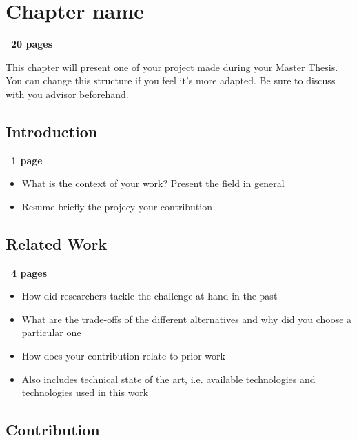 \chapter{Chapter name}

\textbf{~20 pages}

This chapter will present one of your project made during your Master Thesis.
You can change this structure if you feel it's more adapted. Be sure to discuss with you advisor beforehand.

\section{Introduction}

\textbf{~1 page}
\begin{itemize}
    \item What is the context of your work? Present the field in general
    \item Resume briefly the projecy your contribution
\end{itemize}

\section{Related Work}

\textbf{~4 pages}
\begin{itemize}
    \item How did researchers tackle the challenge at hand in the past
    \item What are the trade-offs of the different alternatives and why did you choose a particular one
    \item How does your contribution relate to prior work
    \item Also includes technical state of the art, i.e. available technologies and technologies used in this work
\end{itemize}

\section{Contribution}

